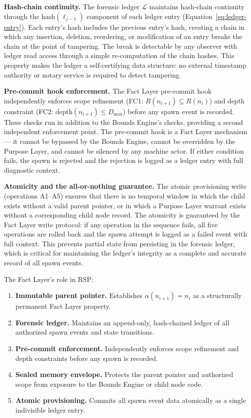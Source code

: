 \medskip
\noindent\textbf{Hash-chain continuity.} The forensic ledger $\mathcal{L}$ maintains hash-chain continuity through the $\text{hash}(\ell_{j-1})$ component of each ledger entry (Equation~\ref{eq:ledger-entry}). Each entry's hash includes the previous entry's hash, creating a chain in which any insertion, deletion, reordering, or modification of an entry breaks the chain at the point of tampering. The break is detectable by any observer with ledger read access through a simple re-computation of the chain hashes. This property makes the ledger a self-certifying data structure: no external timestamp authority or notary service is required to detect tampering.

\medskip
\noindent\textbf{Pre-commit hook enforcement.} The Fact Layer pre-commit hook independently enforces scope refinement (FC1: $R(n_{i+1}) \subseteq R(n_i)$) and depth constraint (FC2: $\text{depth}(n_{i+1}) \leq D_{\max}$) before any spawn event is recorded. These checks run in addition to the Bounds Engine's checks, providing a second independent enforcement point. The pre-commit hook is a Fact Layer mechanism --- it cannot be bypassed by the Bounds Engine, cannot be overridden by the Purpose Layer, and cannot be silenced by any machine actor. If either condition fails, the spawn is rejected and the rejection is logged as a ledger entry with full diagnostic context.

\medskip
\noindent\textbf{Atomicity and the all-or-nothing guarantee.} The atomic provisioning write (operations A1--A5) ensures that there is no temporal window in which the child exists without a valid parent pointer, or in which a Purpose Layer warrant exists without a corresponding child node record. The atomicity is guaranteed by the Fact Layer write protocol: if any operation in the sequence fails, all five operations are rolled back and the spawn attempt is logged as a failed event with full context. This prevents partial state from persisting in the forensic ledger, which is critical for maintaining the ledger's integrity as a complete and accurate record of all spawn events.

The Fact Layer's role in RSP:

\begin{enumerate}
    \item[(FLR1)] \textbf{Immutable parent pointer.} Establishes $\alpha(n_{i+1}) = n_i$ as a structurally permanent Fact Layer property.
    \item[(FLR2)] \textbf{Forensic ledger.} Maintains an append-only, hash-chained ledger of all authorized spawn events and state transitions.
    \item[(FLR3)] \textbf{Pre-commit enforcement.} Independently enforces scope refinement and depth constraints before any spawn is recorded.
    \item[(FLR4)] \textbf{Sealed memory envelope.} Protects the parent pointer and authorized scope from exposure to the Bounds Engine or child node code.
    \item[(FLR5)] \textbf{Atomic provisioning.} Commits all spawn event data atomically as a single indivisible ledger entry.
\end{enumerate}

